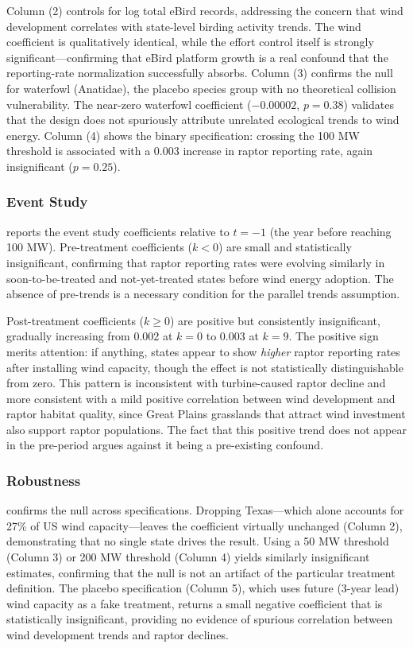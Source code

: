 \documentclass[12pt]{article}
\begin{document}
Column (2) controls for log total eBird records, addressing the concern that wind development correlates with state-level birding activity trends. The wind coefficient is qualitatively identical, while the effort control itself is strongly significant---confirming that eBird platform growth is a real confound that the reporting-rate normalization successfully absorbs. Column (3) confirms the null for waterfowl (Anatidae), the placebo species group with no theoretical collision vulnerability. The near-zero waterfowl coefficient ($-0.00002$, $p = 0.38$) validates that the design does not spuriously attribute unrelated ecological trends to wind energy. Column (4) shows the binary specification: crossing the 100 MW threshold is associated with a 0.003 increase in raptor reporting rate, again insignificant ($p = 0.25$).

\subsubsection*{Event Study}  reports the event study coefficients relative to $t = -1$ (the year before reaching 100 MW). Pre-treatment coefficients ($k < 0$) are small and statistically insignificant, confirming that raptor reporting rates were evolving similarly in soon-to-be-treated and not-yet-treated states before wind energy adoption. The absence of pre-trends is a necessary condition for the parallel trends assumption.

Post-treatment coefficients ($k \geq 0$) are positive but consistently insignificant, gradually increasing from 0.002 at $k = 0$ to 0.003 at $k = 9$. The positive sign merits attention: if anything, states appear to show \textit{higher} raptor reporting rates after installing wind capacity, though the effect is not statistically distinguishable from zero. This pattern is inconsistent with turbine-caused raptor decline and more consistent with a mild positive correlation between wind development and raptor habitat quality, since Great Plains grasslands that attract wind investment also support raptor populations. The fact that this positive trend does not appear in the pre-period argues against it being a pre-existing confound.

\subsubsection*{Robustness}  confirms the null across specifications. Dropping Texas---which alone accounts for 27\% of US wind capacity---leaves the coefficient virtually unchanged (Column 2), demonstrating that no single state drives the result. Using a 50 MW threshold (Column 3) or 200 MW threshold (Column 4) yields similarly insignificant estimates, confirming that the null is not an artifact of the particular treatment definition. The placebo specification (Column 5), which uses future (3-year lead) wind capacity as a fake treatment, returns a small negative coefficient that is statistically insignificant, providing no evidence of spurious correlation between wind development trends and raptor declines.
\end{document}
